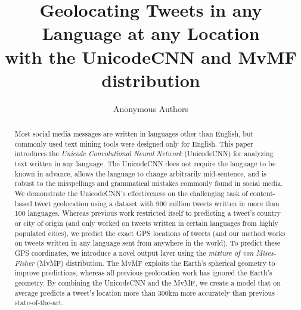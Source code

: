 \documentclass[sigconf,anonymous,review]{acmart}
\title{Geolocating Tweets in any Language at any Location\\with the UnicodeCNN and MvMF distribution}
\author{Anonymous Authors}
\affiliation{}
\newcommand{\defn}[1]{\textit{#1}}
\begin{document}
\begin{abstract}
    Most social media messages are written in languages other than English,
    but commonly used text mining tools were designed only for English.
    This paper introduces the \defn{Unicode Convolutional Neural Network} (UnicodeCNN) for analyzing text written in any language.
    The UnicodeCNN does not require the language to be known in advance,
    allows the language to change arbitrarily mid-sentence,
    and is robust to the misspellings and grammatical mistakes commonly found in social media.
    We demonstrate the UnicodeCNN's effectiveness on the challenging task of content-based tweet geolocation using a dataset with 900 million tweets written in more than 100 languages.
    Whereas previous work restricted itself to predicting a tweet's country or city of origin 
    (and only worked on tweets written in certain languages from highly populated cities),
    we predict the exact GPS locations of tweets 
    (and our method works on tweets written in any language sent from anywhere in the world).
    To predict these GPS coordinates,
    we introduce a novel output layer using the \defn{mixture of von Mises-Fisher} (MvMF) distribution.
    The MvMF exploits the Earth's spherical geometry to improve predictions,
    whereas all previous geolocation work has ignored the Earth's geometry.
    By combining the UnicodeCNN and the MvMF,
    we create a model that on average predicts a tweet's location more than 300km more accurately than previous state-of-the-art.

\end{abstract}
\end{document}
